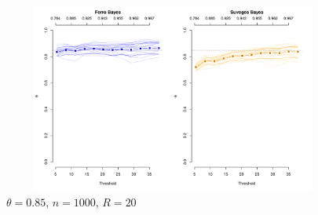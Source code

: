 \documentclass[12pt]{article}
\begin{document}
\begin{figure}
\begin{center}
\includegraphics[width=5.5in, height=2.45in]{../extremal_comparison/figs/sim_frechet_hier_85_1000_20.pdf}
\caption{$\theta=0.85$, $n=1000$, $R=20$}
\end{center}
\end{figure}
\end{document}
